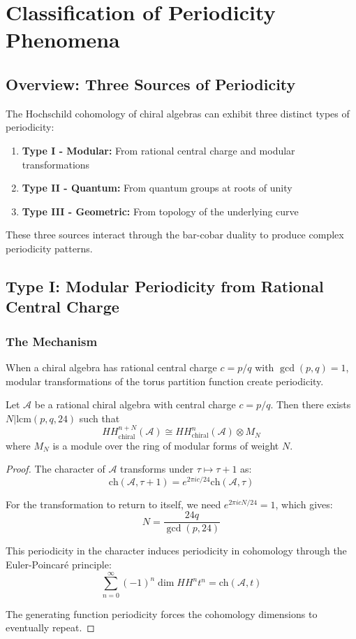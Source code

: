 \section{Classification of Periodicity Phenomena}

\subsection{Overview: Three Sources of Periodicity}

The Hochschild cohomology of chiral algebras can exhibit three distinct types of periodicity:

\begin{enumerate}
\item \textbf{Type I - Modular:} From rational central charge and modular transformations
\item \textbf{Type II - Quantum:} From quantum groups at roots of unity
\item \textbf{Type III - Geometric:} From topology of the underlying curve
\end{enumerate}

These three sources interact through the bar-cobar duality to produce complex periodicity patterns.

\subsection{Type I: Modular Periodicity from Rational Central Charge}

\subsubsection{The Mechanism}

When a chiral algebra has rational central charge $c = p/q$ with $\gcd(p,q) = 1$, modular transformations of the torus partition function create periodicity.

\begin{theorem}
Let $\mathcal{A}$ be a rational chiral algebra with central charge $c = p/q$. Then there exists $N | \text{lcm}(p,q,24)$ such that
\[
HH^{n+N}_{\text{chiral}}(\mathcal{A}) \cong HH^n_{\text{chiral}}(\mathcal{A}) \otimes M_N
\]
where $M_N$ is a module over the ring of modular forms of weight $N$.
\end{theorem}

\begin{proof}
The character of $\mathcal{A}$ transforms under $\tau \mapsto \tau + 1$ as:
\[
\text{ch}(\mathcal{A}, \tau+1) = e^{2\pi i c/24} \text{ch}(\mathcal{A}, \tau)
\]

For the transformation to return to itself, we need $e^{2\pi i cN/24} = 1$, which gives:
\[
N = \frac{24q}{\gcd(p,24)}
\]

This periodicity in the character induces periodicity in cohomology through the Euler-Poincaré principle:
\[
\sum_{n=0}^{\infty} (-1)^n \dim HH^n t^n = \text{ch}(\mathcal{A}, t)
\]

The generating function periodicity forces the cohomology dimensions to eventually repeat.
\end{proof}

